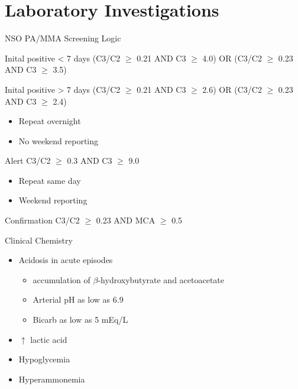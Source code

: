 \documentclass[presentation, smaller]{beamer}
\begin{document}
\section{Laboratory Investigations}
\label{sec:orgheadline18}
\begin{frame}[label={sec:orgheadline14}]{NSO PA/MMA Screening Logic}
\begin{block}{Inital positive \textless{} 7 days}
(C3/C2 \(\ge\) 0.21 AND C3 \(\ge\) 4.0)
OR
(C3/C2 \(\ge\) 0.23 AND C3 \(\ge\) 3.5)
\end{block}
\begin{block}{Inital positive \textgreater{} 7 days}
(C3/C2 \(\ge\) 0.21 AND C3 \(\ge\) 2.6)
OR
(C3/C2 \(\ge\) 0.23 AND C3 \(\ge\) 2.4)
\begin{itemize}
\item Repeat overnight
\item No weekend reporting
\end{itemize}
\end{block}
\begin{block}{Alert}
C3/C2 \(\ge\) 0.3 AND C3 \(\ge\) 9.0
\begin{itemize}
\item Repeat same day
\item Weekend reporting
\end{itemize}
\end{block}
\begin{block}{Confirmation}
C3/C2 \(\ge\) 0.23 AND MCA \(\ge\) 0.5
\end{block}
\end{frame}

\begin{frame}[label={sec:orgheadline15}]{Clinical Chemistry}
\begin{itemize}
\item Acidosis in acute episodes
\begin{itemize}
\item accumulation of \(\beta\)-hydroxybutyrate and acetoacetate
\item Arterial pH as low as 6.9
\item Bicarb as low as 5 mEq/L
\end{itemize}
\item \(\uparrow\) lactic acid
\item Hypoglycemia
\item Hyperammonemia
\end{itemize}
\end{frame}
\end{document}
